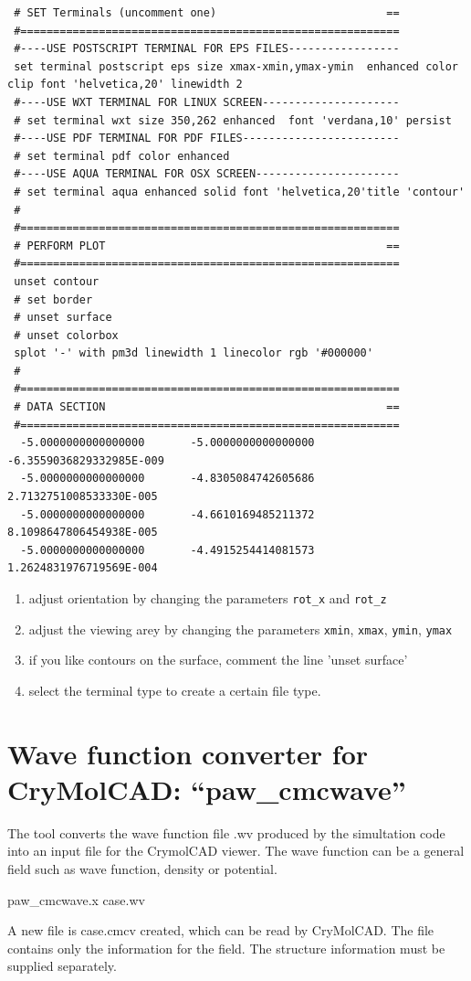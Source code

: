 \documentclass[final,12pt]{article}
\begin{document}
{{{{{{{\begin{verbatim}
 # SET Terminals (uncomment one)                          ==
 #==========================================================
 #----USE POSTSCRIPT TERMINAL FOR EPS FILES-----------------
 set terminal postscript eps size xmax-xmin,ymax-ymin  enhanced color clip font 'helvetica,20' linewidth 2 
 #----USE WXT TERMINAL FOR LINUX SCREEN---------------------
 # set terminal wxt size 350,262 enhanced  font 'verdana,10' persist 
 #----USE PDF TERMINAL FOR PDF FILES------------------------
 # set terminal pdf color enhanced 
 #----USE AQUA TERMINAL FOR OSX SCREEN----------------------
 # set terminal aqua enhanced solid font 'helvetica,20'title 'contour'
 #
 #==========================================================
 # PERFORM PLOT                                           ==
 #==========================================================
 unset contour
 # set border
 # unset surface
 # unset colorbox
 splot '-' with pm3d linewidth 1 linecolor rgb '#000000'
 #
 #==========================================================
 # DATA SECTION                                           ==
 #==========================================================
  -5.0000000000000000       -5.0000000000000000       -6.3559036829332985E-009
  -5.0000000000000000       -4.8305084742605686        2.7132751008533330E-005
  -5.0000000000000000       -4.6610169485211372        8.1098647806454938E-005
  -5.0000000000000000       -4.4915254414081573        1.2624831976719569E-004
\end{verbatim}}

\begin{enumerate}
\item adjust orientation by changing the parameters \verb|rot_x| and
  \verb|rot_z|
\item adjust the viewing arey by changing the parameters \verb|xmin|,
  \verb|xmax|, \verb|ymin|, \verb|ymax|
\item if you like contours on the surface, comment the line 'unset surface'
\item select the terminal type to create a certain file type.
\end{enumerate}



\newpage
\section{Wave function converter for CryMolCAD: ``paw\_cmcwave''}
The tool converts the wave function file .wv produced by the
simultation code into an input file for the CrymolCAD viewer. The wave
function can be a general field such as wave function, density or
potential.
\begin{center}
paw\_cmcwave.x case.wv
\end{center}
A new file is case.cmcv created, which can be read by CryMolCAD. The
file contains only the information for the field. The structure
information must be supplied separately.


}}}}}}
\end{document}
